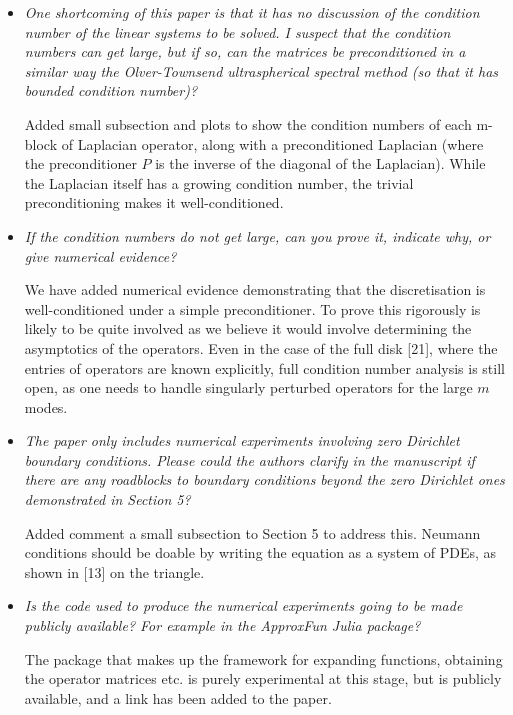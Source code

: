 \documentclass[10pt]{letter}
\newcommand{\comment}[1]{\textit{\color{bluey}#1}}
\begin{document}
\begin{itemize}[parsep=1em,leftmargin=1em]

\item \comment{One shortcoming of this paper is that it has no discussion of the condition number of the linear systems to be solved. I suspect that the condition numbers can get large, but if so, can the matrices be preconditioned in a similar way the Olver-Townsend ultraspherical spectral method (so that it has bounded condition number)?}

Added small subsection and plots to show the condition numbers of each m-block of Laplacian operator, along with a preconditioned Laplacian (where the preconditioner $P$ is the inverse of the diagonal of the Laplacian). While the Laplacian itself has a growing condition number, the trivial preconditioning makes it well-conditioned. 


\item \comment{If the condition numbers do not get large, can you prove it, indicate why, or give numerical evidence?}

We have added numerical evidence demonstrating that the discretisation is well-conditioned under a simple preconditioner. To prove this rigorously is likely to be quite involved as we believe it would involve determining the asymptotics of the operators. Even in the case of the full disk [21], where the entries of operators are known explicitly, full condition number analysis is still open, as one needs to handle singularly perturbed operators for the large $m$ modes.


\item \comment{The paper only includes numerical experiments involving zero Dirichlet boundary conditions. Please could the authors clarify in the manuscript if there are any roadblocks to boundary conditions beyond the zero Dirichlet ones demonstrated in Section 5?}

Added comment a small subsection to Section 5 to address this. Neumann conditions should be doable by writing the equation as a system of PDEs, as shown in [13] on the triangle.


\item \comment{Is the code used to produce the numerical experiments going to be made publicly available? For example in the ApproxFun Julia package?}

The package that makes up the framework for expanding functions, obtaining the operator matrices etc. is purely experimental at this stage, but is publicly available, and a link has been added to the paper.


\end{itemize}
\end{document}
